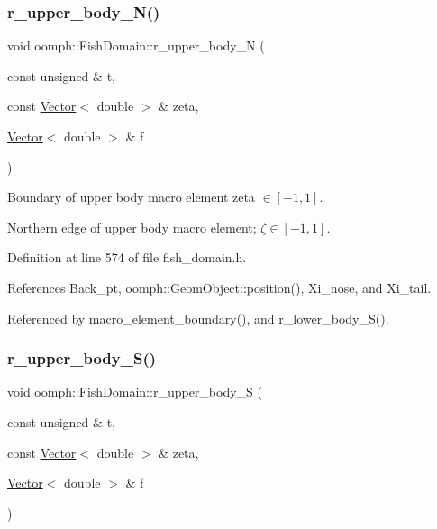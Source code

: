\subsubsection{\texorpdfstring{r\+\_\+upper\+\_\+body\+\_\+\+N()}{r\_upper\_body\_N()}}
{\footnotesize\ttfamily void oomph\+::\+Fish\+Domain\+::r\+\_\+upper\+\_\+body\+\_\+N (\begin{DoxyParamCaption}\item[{const unsigned \&}]{t,  }\item[{const \hyperlink{classoomph_1_1Vector}{Vector}$<$ double $>$ \&}]{zeta,  }\item[{\hyperlink{classoomph_1_1Vector}{Vector}$<$ double $>$ \&}]{f }\end{DoxyParamCaption})\hspace{0.3cm}{\ttfamily [private]}}



Boundary of upper body macro element zeta $ \in [-1,1] $. 

Northern edge of upper body macro element; $ \zeta \in [-1,1] $. 

Definition at line 574 of file fish\+\_\+domain.\+h.



References Back\+\_\+pt, oomph\+::\+Geom\+Object\+::position(), Xi\+\_\+nose, and Xi\+\_\+tail.



Referenced by macro\+\_\+element\+\_\+boundary(), and r\+\_\+lower\+\_\+body\+\_\+\+S().

\mbox{\label{classoomph_1_1FishDomain_af30cc8b5bc73f1d2e71099c19b2a0d98}} 
\subsubsection{\texorpdfstring{r\+\_\+upper\+\_\+body\+\_\+\+S()}{r\_upper\_body\_S()}}
{\footnotesize\ttfamily void oomph\+::\+Fish\+Domain\+::r\+\_\+upper\+\_\+body\+\_\+S (\begin{DoxyParamCaption}\item[{const unsigned \&}]{t,  }\item[{const \hyperlink{classoomph_1_1Vector}{Vector}$<$ double $>$ \&}]{zeta,  }\item[{\hyperlink{classoomph_1_1Vector}{Vector}$<$ double $>$ \&}]{f }\end{DoxyParamCaption})\hspace{0.3cm}{\ttfamily [private]}}



